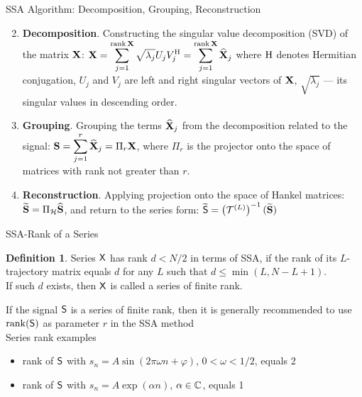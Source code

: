 \documentclass[pdf, unicode, ucs, notheorems]{beamer}
\theoremstyle{definition}
\newtheorem{definition}{Definition}
\begin{document}
\begin{frame}{SSA Algorithm: Decomposition, Grouping, Reconstruction}
  \begin{enumerate}
      \setcounter{enumi}{1}
    \item \textbf{Decomposition}.
      Constructing the singular value decomposition (SVD) of the matrix $\mathbf{X}$:
      $\displaystyle \mathbf{X} = \sum_{j=1}^{\operatorname{rank}\mathbf{X}}
      \sqrt{\lambda_j} U_j V_j^{\mathrm{H}} =
      \sum_{j=1}^{\operatorname{rank}\mathbf{X}} \widehat{\mathbf{X}}_j$
      where $\mathrm{H}$ denotes Hermitian
      conjugation, $U_j$ and $V_j$ are left and right singular vectors
      of $\mathbf{X}$, $\sqrt{\lambda_j}$ --- its singular values in
      descending order.
      \vspace{0.2cm}\\
    \item \textbf{Grouping}. Grouping the terms $\widehat{\mathbf{X}}_j$
      from the decomposition related to the signal:
      $\displaystyle \mathbf{S} = \sum_{j=1}^{r}\widehat{\mathbf{X}}_j = \Pi_r \mathbf{X}$,
      where $\Pi_r$ is the projector onto the space of matrices with
      rank not greater than $r$.
      \vspace{0.2cm}
    \item \textbf{Reconstruction}. Applying projection onto the
      space of Hankel
      matrices: $\widetilde{\mathbf{S}}= \Pi_{\mathcal{H}}\widehat{\mathbf{S}}$,
      and return to the series form: $\widetilde{\mathsf{S}}=
      \left(\mathcal{T}^{(L)}\right)^{-1}(\widetilde{\mathbf{S}})$
  \end{enumerate}
\end{frame}

\begin{frame}{SSA-Rank of a Series}
  \begin{definition}
    Series $\mathsf{X}$ has rank $d < N/2$ in terms of SSA, if the rank of
    its $L$-trajectory matrix equals $d$ for any $L$ such that $d
    \leqslant \min(L,
    N - L + 1)$.\\
    If such $d$ exists, then $\mathsf{X}$ is called a series of finite rank.
  \end{definition}
  \vspace{0.5cm}
  If the signal $\mathsf{S}$ is a series of finite rank, then it is
  generally recommended to use $\operatorname{rank}(\mathsf{S})$ as
  parameter $r$ in the SSA method
  \vspace{0.4cm}\\
  Series rank examples
  \begin{itemize}
    \item rank of $\mathsf{S}$ with $s_n = A\sin(2\pi \omega n + \varphi)$,
      $0 < \omega < 1/2$, equals 2
    \item rank of $\mathsf{S}$ with $s_n = A \exp(\alpha n)$, $\alpha
      \in\mathbb{C}$, equals 1
  \end{itemize}
\end{frame}
\end{document}
